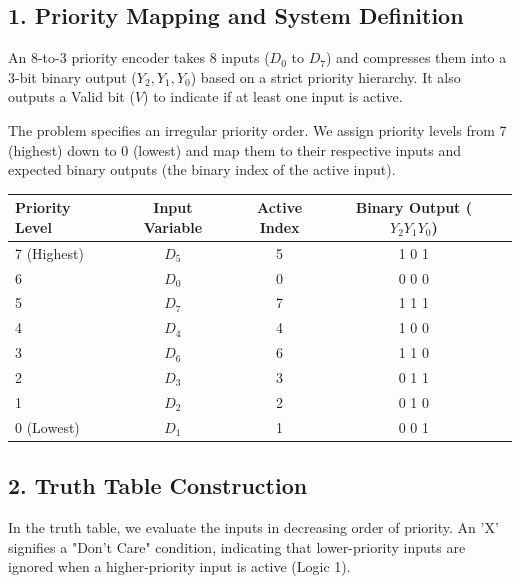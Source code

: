 \documentclass[12pt,a3paper]{article}
\begin{document}
\begin{enumerate}
\begin{tcolorbox}[enhanced,breakable,ansbox,colback=cD!4,colframe=cD,boxrule=0.8pt,arc=5pt,title={\textbf{Answer}},fonttitle=\bfseries\color{white},colbacktitle=cD]

\subsection*{1. Priority Mapping and System Definition}

An 8-to-3 priority encoder takes 8 inputs ($D_0$ to $D_7$) and compresses them into a 3-bit binary output ($Y_2, Y_1, Y_0$) based on a strict priority hierarchy. It also outputs a Valid bit ($V$) to indicate if at least one input is active. 

The problem specifies an irregular priority order. We assign priority levels from 7 (highest) down to 0 (lowest) and map them to their respective inputs and expected binary outputs (the binary index of the active input).

\begin{center}
\renewcommand{\arraystretch}{1.2}
\begin{tabular}{lcccc}
\toprule
\textbf{Priority Level} & \textbf{Input Variable} & \textbf{Active Index} & \textbf{Binary Output ($Y_2 Y_1 Y_0$)} \\
\midrule
7 (Highest) & \textbf{$D_5$} & 5 & 1 0 1 \\
6 & \textbf{$D_0$} & 0 & 0 0 0 \\
5 & \textbf{$D_7$} & 7 & 1 1 1 \\
4 & \textbf{$D_4$} & 4 & 1 0 0 \\
3 & \textbf{$D_6$} & 6 & 1 1 0 \\
2 & \textbf{$D_3$} & 3 & 0 1 1 \\
1 & \textbf{$D_2$} & 2 & 0 1 0 \\
0 (Lowest)  & \textbf{$D_1$} & 1 & 0 0 1 \\
\bottomrule
\end{tabular}
\end{center}

\subsection*{2. Truth Table Construction}

In the truth table, we evaluate the inputs in decreasing order of priority. An 'X' signifies a "Don't Care" condition, indicating that lower-priority inputs are ignored when a higher-priority input is active (Logic 1).


\end{tcolorbox}
\end{enumerate}
\end{document}
